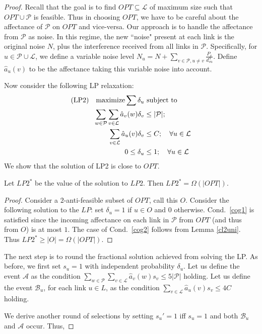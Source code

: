 \documentclass[11pt]{amsart}
\def\calL{{\mathcal L}}
\def\calP{{\mathcal P}}
\begin{document}
\begin{proof}
Recall that the goal is to find $OPT \subseteq \calL$ of maximum size
such that $OPT \cup \calP$ is feasible. Thus in choosing $OPT$, we
have to be careful about the affectance of $\calP$ on $OPT$ and
vice-versa. Our approach is to handle the affectance from $\calP$ as
noise. In this regime, the new ``noise" present at each link is the
original noise $N$, plus the interference received from all links in
$\calP$. Specifically, for $u \in \calP \cup \calL$,
we define a variable noise level $N_{u} = N + \sum_{v \in
  \calP, u \neq v} \frac{P_v}{d_{vu}^{\alpha}}$.  Define $\hat{a}_u(v)$
to be the affectance taking this variable noise into account.

Now consider the following LP relaxation:
\begin{align}
\text{(LP2)\quad maximize} \sum \delta_u & \text{ subject to} \nonumber\\
\sum_{w \in \calP} \sum_{v \in \calL} \hat{a}_v(w) \delta_v & \leq |\calP|; \quad  \label{cog1} \\
\sum_{v \in \calL} \hat{a}_u(v) \delta_v & \leq C; \quad \forall u \in \calL \label{cog2} \\
0 \leq \delta_u & \leq 1; \quad \forall u \in \calL \nonumber
\end{align}
We show that the solution of LP2 is close to $OPT$.
\begin{lemma}
Let $LP2^*$ be the value of the solution to $LP2$. Then $LP2^* = \Omega(|OPT|)$.
\end{lemma}
\begin{proof}
Consider a $2$-anti-feasible subset of $OPT$, call this $O$.
Consider the following solution to the $LP$: set $\delta_u = 1$ if $u \in O$ and $0$ otherwise.
Cond.\ \ref{cog1} is satisfied since the incoming affectance on 
each link in $\calP$ from $OPT$ (and thus from $O$) is at most $1$. 
The case of Cond.\ \ref{cog2} follows from Lemma \ref{cl2uni}. Thus $LP2^* \geq |O| = \Omega(|OPT|)$.
\end{proof}

The next step is to round the fractional solution achieved from solving the LP. As before, we first set $s_u =1$ with independent probability $\delta_u$.
Let us define the event $\mathcal{A}$ as the condition $\sum_{w \in \calP} \sum_{v \in \calL} \hat{a}_v(w) s_v \leq 5 |\calP|$ holding. Let us define the event $\mathcal{B}_u$, for each link $u \in L$, as the condition $\sum_{v \in \calL} \hat{a}_u(v) s_v \leq 4 C$ holding.

We derive another round of selections by setting  $s_u' = 1$ iff $s_u = 1$ and both $\mathcal{B}_u$ and $\mathcal{A}$ occur. Thus,
 

\end{proof}
\end{document}
